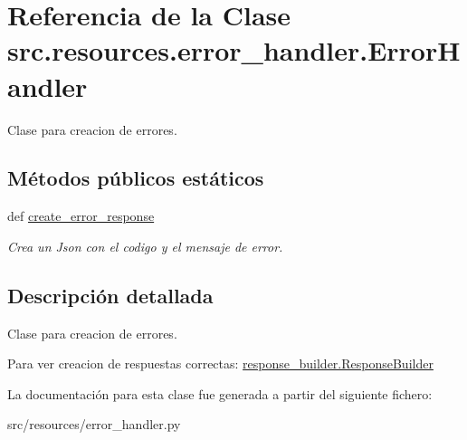 \hypertarget{classsrc_1_1resources_1_1error__handler_1_1_error_handler}{\section{Referencia de la Clase src.\-resources.\-error\-\_\-handler.\-Error\-Handler}
\label{classsrc_1_1resources_1_1error__handler_1_1_error_handler}
}


Clase para creacion de errores.  


\subsection*{Métodos públicos estáticos}
\begin{DoxyCompactItemize}
\item 
\hypertarget{classsrc_1_1resources_1_1error__handler_1_1_error_handler_a93f481928c27dccb20a627eaa35f6224}{def \hyperlink{classsrc_1_1resources_1_1error__handler_1_1_error_handler_a93f481928c27dccb20a627eaa35f6224}{create\-\_\-error\-\_\-response}}\label{classsrc_1_1resources_1_1error__handler_1_1_error_handler_a93f481928c27dccb20a627eaa35f6224}

\begin{DoxyCompactList}\small\item\em Crea un Json con el codigo y el mensaje de error. \end{DoxyCompactList}\end{DoxyCompactItemize}


\subsection{Descripción detallada}
Clase para creacion de errores. 

Para ver creacion de respuestas correctas\-: \hyperlink{classsrc_1_1resources_1_1response__builder_1_1_response_builder}{response\-\_\-builder.\-Response\-Builder} 

La documentación para esta clase fue generada a partir del siguiente fichero\-:\begin{DoxyCompactItemize}
\item 
src/resources/error\-\_\-handler.\-py\end{DoxyCompactItemize}
